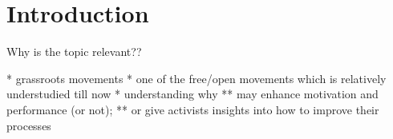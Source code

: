 \section{Introduction}

Why is the topic relevant??

* grassroots movements
* one of the free/open movements which is relatively understudied till now
* understanding why
  ** may enhance motivation and performance (or not);
  ** or give activists insights into how to improve their processes

\begin{comment}
* Untersuchungsgegenstand
* Erkenntnisinteresse
* Forschungsstand
* Ergebnisse können/sollen angedeuten werden
\end{comment}


